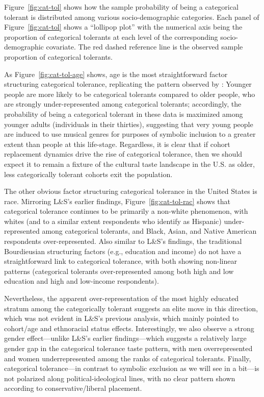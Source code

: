 \documentclass[12pt]{article}
\begin{document}
Figure~\ref{fig:cat-tol} shows how the sample probability of being a categorical tolerant is distributed among various socio-demographic categories. Each panel of Figure~\ref{fig:cat-tol} shows a ``lollipop plot'' with the numerical axis being the proportion of categorical tolerants at each level of the corresponding socio-demographic covariate. The red dashed reference line is the observed sample proportion of categorical tolerants. 

As Figure~\ref{fig:cat-tol-age} shows, age is the most straightforward factor structuring categorical tolerance, replicating the pattern observed by \citet{lizardo2016end-4fb}: Younger people are more likely to be categorical tolerants compared to older people, who are strongly under-represented among categorical tolerants; accordingly, the probability of being a categorical tolerant in these data is maximized among younger adults (individuals in their thirties), suggesting that very young people are induced to use musical genres for purposes of symbolic inclusion to a greater extent than people at this life-stage. Regardless, it is clear that if cohort replacement dynamics drive the rise of categorical tolerance, then we should expect it to remain a fixture of the cultural taste landscape in the U.S. as older, less categorically tolerant cohorts exit the population. 

The other obvious factor structuring categorical tolerance in the United States is race. Mirroring L\&S's earlier findings, Figure~\ref{fig:cat-tol-rac} shows that categorical tolerance continues to be primarily a non-white phenomenon, with whites (and to a similar extent respondents who identify as Hispanic) under-represented among categorical tolerants, and Black, Asian, and Native American respondents over-represented. Also similar to L\&S's findings, the traditional Bourdieusian structuring factors (e.g., education and income) do not have a straightforward link to categorical tolerance, with both showing non-linear patterns (categorical tolerants over-represented among both high and low education and high and low-income respondents). 

Nevertheless, the apparent over-representation of the most highly educated stratum among the categorically tolerant suggests an elite move in this direction, which was not evident in L\&S's previous analysis, which mainly pointed to cohort/age and ethnoracial status effects. Interestingly, we also observe a strong gender effect---unlike L\&S's earlier findings---which suggests a relatively large gender gap in the categorical tolerance taste pattern, with men overrepresented and women underrepresented among the ranks of categorical tolerants. Finally, categorical tolerance---in contrast to symbolic exclusion as we will see in a bit---is not polarized along political-ideological lines, with no clear pattern shown according to conservative/liberal placement. 
\end{document}

